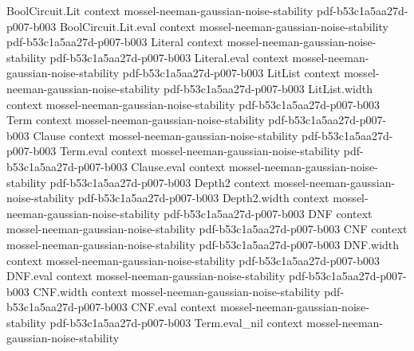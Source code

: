 \begin{theorem}
\label{BooleanAnalysis.GaussianSpace.majority_is_stablest_general_volume}
\leanok
{}
\proofstep
  {BoolCircuit.Lit}
  {context}
  {mossel-neeman-gaussian-noise-stability}
  {pdf-b53c1a5aa27d-p007-b003}
\proofstep
  {BoolCircuit.Lit.eval}
  {context}
  {mossel-neeman-gaussian-noise-stability}
  {pdf-b53c1a5aa27d-p007-b003}
\proofstep
  {Literal}
  {context}
  {mossel-neeman-gaussian-noise-stability}
  {pdf-b53c1a5aa27d-p007-b003}
\proofstep
  {Literal.eval}
  {context}
  {mossel-neeman-gaussian-noise-stability}
  {pdf-b53c1a5aa27d-p007-b003}
\proofstep
  {LitList}
  {context}
  {mossel-neeman-gaussian-noise-stability}
  {pdf-b53c1a5aa27d-p007-b003}
\proofstep
  {LitList.width}
  {context}
  {mossel-neeman-gaussian-noise-stability}
  {pdf-b53c1a5aa27d-p007-b003}
\proofstep
  {Term}
  {context}
  {mossel-neeman-gaussian-noise-stability}
  {pdf-b53c1a5aa27d-p007-b003}
\proofstep
  {Clause}
  {context}
  {mossel-neeman-gaussian-noise-stability}
  {pdf-b53c1a5aa27d-p007-b003}
\proofstep
  {Term.eval}
  {context}
  {mossel-neeman-gaussian-noise-stability}
  {pdf-b53c1a5aa27d-p007-b003}
\proofstep
  {Clause.eval}
  {context}
  {mossel-neeman-gaussian-noise-stability}
  {pdf-b53c1a5aa27d-p007-b003}
\proofstep
  {Depth2}
  {context}
  {mossel-neeman-gaussian-noise-stability}
  {pdf-b53c1a5aa27d-p007-b003}
\proofstep
  {Depth2.width}
  {context}
  {mossel-neeman-gaussian-noise-stability}
  {pdf-b53c1a5aa27d-p007-b003}
\proofstep
  {DNF}
  {context}
  {mossel-neeman-gaussian-noise-stability}
  {pdf-b53c1a5aa27d-p007-b003}
\proofstep
  {CNF}
  {context}
  {mossel-neeman-gaussian-noise-stability}
  {pdf-b53c1a5aa27d-p007-b003}
\proofstep
  {DNF.width}
  {context}
  {mossel-neeman-gaussian-noise-stability}
  {pdf-b53c1a5aa27d-p007-b003}
\proofstep
  {DNF.eval}
  {context}
  {mossel-neeman-gaussian-noise-stability}
  {pdf-b53c1a5aa27d-p007-b003}
\proofstep
  {CNF.width}
  {context}
  {mossel-neeman-gaussian-noise-stability}
  {pdf-b53c1a5aa27d-p007-b003}
\proofstep
  {CNF.eval}
  {context}
  {mossel-neeman-gaussian-noise-stability}
  {pdf-b53c1a5aa27d-p007-b003}
\proofstep
  {Term.eval_nil}
  {context}
  {mossel-neeman-gaussian-noise-stability}

\end{theorem}
